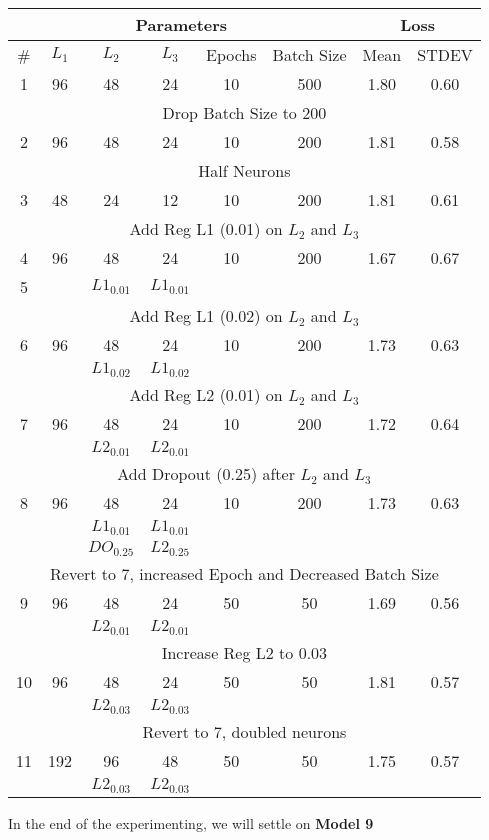 \begin{tabular}{|c|c|c|c|c|c|c|c|} 
\hline
\multicolumn{6}{|c|}{Parameters} & \multicolumn{2}{|c|}{Loss}  \\
\hline
\# & $L_1$ & $L_2$ & $L_3$ & Epochs & Batch Size & Mean & STDEV \\
\hline
1 & 96 & 48 & 24 & 10 & 500 & 1.80 & 0.60 \\ \hline
\multicolumn{8}{|c|}{Drop Batch Size to 200}  \\ \hline
2 & 96 & 48 & 24 & 10 & 200 & 1.81 & 0.58 \\ \hline
\multicolumn{8}{|c|}{Half Neurons}  \\ \hline
3 & 48 & 24 & 12 & 10 & 200 & 1.81 & 0.61 \\ \hline
\multicolumn{8}{|c|}{Add Reg L1 (0.01) on $L_2$ and $L_3$}  \\ \hline
4 & 96 & 48 & 24 & 10 & 200 & 1.67 & 0.67  \\ \hline
5 & {} & $L1_{0.01}$ & $L1_{0.01}$ & {} & {} & {} & {} \\ \hline
\multicolumn{8}{|c|}{Add Reg L1 (0.02) on $L_2$ and $L_3$}  \\ \hline
6 & 96 & 48 & 24 & 10 & 200 & 1.73 & 0.63  \\ \hline
{} & {} & $L1_{0.02}$ & $L1_{0.02}$ & {} & {} & {} & {} \\ \hline
\multicolumn{8}{|c|}{Add Reg L2 (0.01) on $L_2$ and $L_3$}  \\ \hline
7 & 96 & 48 & 24 & 10 & 200 & 1.72 & 0.64  \\ \hline
{} & {} & $L2_{0.01}$ & $L2_{0.01}$ & {} & {} & {} & {} \\ \hline
\multicolumn{8}{|c|}{Add Dropout (0.25) after $L_2$ and $L_3$}  \\ \hline
8 & 96 & 48 & 24 & 10 & 200 & 1.73 & 0.63  \\ \hline
{} & {} & $L1_{0.01}$ & $L1_{0.01}$ & {} & {} & {} & {} \\ \hline
{} & {} & $DO_{0.25}$ & $L2_{0.25}$ & {} & {} & {} & {} \\ \hline
\multicolumn{8}{|c|}{Revert to 7, increased Epoch and Decreased Batch Size}  \\ \hline
9 & 96 & 48 & 24 & 50 & 50 & 1.69 & 0.56  \\ \hline
{} & {} & $L2_{0.01}$ & $L2_{0.01}$ & {} & {} & {} & {} \\ \hline
\multicolumn{8}{|c|}{Increase Reg L2 to 0.03}  \\ \hline
10 & 96 & 48 & 24 & 50 & 50 & 1.81 & 0.57  \\ \hline
{} & {} & $L2_{0.03}$ & $L2_{0.03}$ & {} & {} & {} & {} \\ \hline
\multicolumn{8}{|c|}{Revert to 7, doubled neurons}  \\ \hline
11 & 192 & 96 & 48 & 50 & 50 & 1.75 & 0.57  \\ \hline
{} & {} & $L2_{0.03}$ & $L2_{0.03}$ & {} & {} & {} & {} \\ \hline
\end{tabular}

In the end of the experimenting, we will settle on \textbf{Model 9}	






